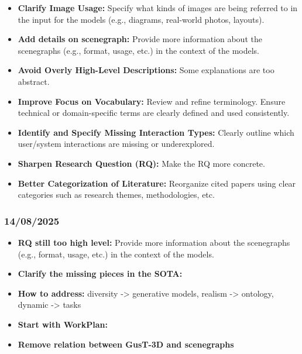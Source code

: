 \documentclass{article}
\begin{document}
\begin{itemize}
    \item \textbf{Clarify Image Usage:} Specify what kinds of images are being referred to in the input for the models (e.g., diagrams, real-world photos, layouts).
    
    \item \textbf{Add details on scenegraph:} Provide more information about the scenegraphs (e.g., format, usage, etc.) in the context of the models.
    
    \item \textbf{Avoid Overly High-Level Descriptions:} Some explanations are too abstract.
    
    \item \textbf{Improve Focus on Vocabulary:} Review and refine terminology. Ensure technical or domain-specific terms are clearly defined and used consistently.
    
    \item \textbf{Identify and Specify Missing Interaction Types:} Clearly outline which user/system interactions are missing or underexplored.
    
    \item \textbf{Sharpen Research Question (RQ):} Make the RQ more concrete.
    
    \item \textbf{Better Categorization of Literature:} Reorganize cited papers using clear categories such as research themes, methodologies, etc.
\end{itemize}

\subsubsection{14/08/2025}    

\begin{itemize}
    \item \textbf{RQ still too high level:} Provide more information about the scenegraphs (e.g., format, usage, etc.) in the context of the models.
    
    \item \textbf{Clarify the missing pieces in the SOTA:} 

    \item \textbf{How to address:} diversity -> generative models, realism -> ontology, dynamic -> tasks
    
    \item \textbf{Start with WorkPlan:}     
    
    \item \textbf{Remove relation between GusT-3D and scenegraphs}
\end{itemize}
\end{document}
